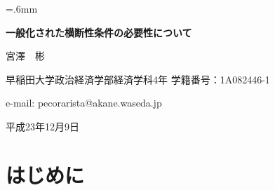\documentclass[a4paper,11pt]{jsarticle}
\begin{document}
\abovedisplayskip=2.55mm
\belowdisplayskip=3.2mm
\xkanjiskip=.6mm

\vspace*{5mm}

\begin{center}
{\huge \textbf{一般化された横断性条件の必要性について}}

\vspace*{8mm}

	{\Large 宮澤　彬}

\vspace*{3mm}

早稲田大学政治経済学部経済学科4年 学籍番号：1A082446-1

\vspace*{2.5mm}

e-mail: pecorarista@akane.waseda.jp

\vspace*{2.5mm}

平成23年12月9日

\end{center}


\vspace*{7mm}




\section{はじめに}
\end{document}
